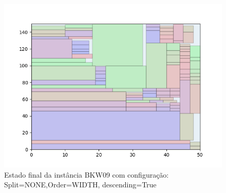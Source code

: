 \begin{figure}[H]
    \centering
    \caption[]{Estado final da instância BKW09 com configuração: Split=NONE,Order=WIDTH, descending=True}
    \label{fig:bkw09-none-width-true}
    \includegraphics[scale=0.5]{output/figures/bkw/bkw09/none/width/true/000}
\end{figure}